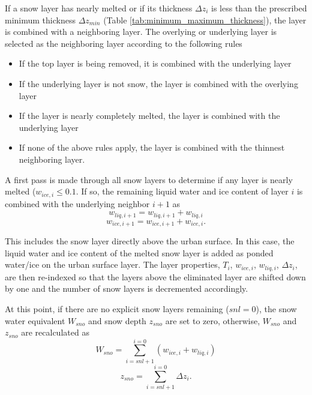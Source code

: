 \documentclass[12pt,authoryear]{elsarticle}
\numberwithin{equation}{section} %
\begin{document}
%
If a snow layer has nearly melted or if its thickness $\Delta z_{i}$ is less than the prescribed minimum thickness $\Delta z_{min}$ (Table \ref{tab:minimum_maximum_thickness}), the layer is combined with a neighboring layer. The overlying or underlying layer is selected as the neighboring layer according to the
following rules
\begin{itemize}
\item If the top layer is being removed, it is combined with the underlying layer
\item If the underlying layer is not snow, the layer is combined with the overlying layer
\item If the layer is nearly completely melted, the layer is combined with the underlying layer
\item If none of the above rules apply, the layer is combined with the thinnest neighboring layer.
\end{itemize}
A first pass is made through all snow layers to determine if any layer is nearly melted ($w_{ice,i}\leq 0.1$. If so, the remaining liquid water and ice content of layer $i$ is combined with the underlying neighbor $i+1$ as
\begin{equation}
w_{liq,i+1} = w_{liq,i+1}+w_{liq,i}
\end{equation}
\begin{equation}
w_{ice,i+1} = w_{ice,i+1}+w_{ice,i}.
\end{equation}

This includes the snow layer directly above the urban surface. In this case, the liquid water and ice content of the melted snow layer is added as ponded water/ice on the urban surface layer. The layer properties, $T_{i}$, $w_{ice,i}$, $w_{liq,i}$, $\Delta z_{i}$, are then re-indexed so that the layers above the eliminated layer are shifted down by one and the number of snow layers
is decremented accordingly. 

At this point, if there are no explicit snow layers remaining ($snl=$0), the snow water equivalent $W_{sno}$ and snow depth $z_{sno}$ are set to zero, otherwise, $W_{sno}$ and $z_{sno}$ are recalculated as 
\begin{equation}
W_{sno} = \sum_{i=snl+1}^{i=0}(w_{ice,i}+w_{liq,i})
\end{equation}
\begin{equation}
z_{sno}=\sum_{i=snl+1}^{i=0} \Delta z_{i}.
\end{equation}
\end{document}
